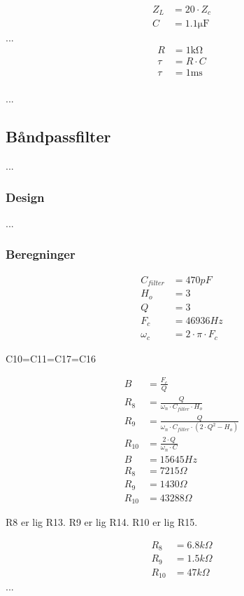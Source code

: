 \begin{align}
	Z_L & = 20 \cdot Z_c \\
	C & = 1.1 \si{\micro\farad}
	\end{align}
...
\begin{align}
	R & = 1 \si{\kilo\ohm} \nonumber \\
	\tau & = R \cdot C \\
	\tau & = 1 \si{\milli\second} \\
	\end{align}

...

\subsection{Båndpassfilter}
...

\subsubsection{Design}
...

\subsubsection{Beregninger}

\begin{align}
C_{filter} & = 470pF\\
H_o & = 3\\
Q & = 3\\
F_c & = 46936Hz \\
\omega_c & = 2 \cdot \pi \cdot F_c
\end{align}

C10=C11=C17=C16

\begin{align}
B & = \frac{F_c}{Q} \\
R_8 & = \frac{Q}{\omega_n \cdot C_{filter} \cdot H_o } \\
R_9 & = \frac{Q}{ \omega_n \cdot C_{filter} \cdot \left( 2 \cdot Q^2 - H_o \right) } \\
R_{10} & = \frac{2 \cdot Q}{ \omega_n \cdot C} \\
B & = 15645Hz \\
R_8 & = 7215 \Omega \\
R_9 & = 1430 \Omega \\
R_{10} & = 43288 \Omega
\end{align}

R8 er lig R13. R9 er lig R14. R10 er lig R15.

\begin{align}
R_8 & = 6.8k \Omega \\
R_9 & = 1.5k \Omega \\
R_{10} & = 47k \Omega
\end{align}
...

